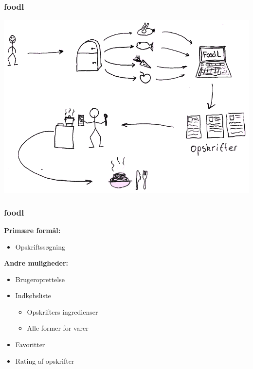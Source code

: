 \begin{frame}
\frametitle{foodl}

	\begin{center}
		\includegraphics[scale=0.5]{billeder/anvendelsesomraade.png}
	\end{center}
	
\end{frame}

\begin{frame}
\frametitle{foodl}

	\textbf{Primære formål:}
	\begin{itemize}
		\item Opskriftssøgning
	\end{itemize}	
	
	\textbf{Andre muligheder:}
	\begin{itemize}	
		\item Brugeroprettelse
		\item Indkøbsliste
		\begin{itemize}
			\item Opskrifters ingredienser
			\item Alle former for varer
		\end{itemize}
		\item Favoritter
		\item Rating af opskrifter
	\end{itemize}

\end{frame}